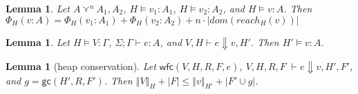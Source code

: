 \documentclass[11pt]{article}
\newcommand{\ssize}[2]{\left\Vert #2 \right\Vert_{#1}}
\newcommand{\gc}[3]{\mathsf{gc}(#1,#2,#3)}
\newcommand{\wfc}[5]{\mathsf{wfc}(#1,#2,#3,#4,#5)}
\newtheorem{lemma}[theorem]{Lemma}
\theoremstyle{definition}
\begin{document}
\begin{lemma}\label{itm:shareSize}
	Let $A \curlyvee^n A_1,A_2$, $H \vDash v_1 : A_1$, $H \vDash v_2 : A_2$, 
	and $H \vDash v : A$. Then $\Phi_{H}(v : A) = 
	\Phi_{H}(v_1 : A_1) + \Phi_{H}(v_2 : A_2) + n\cdot |dom(reach_H(v))|$
\end{lemma}

\begin{lemma}
	Let $H \vDash V : \Gamma$, $\Sigma;\Gamma \vdash e : A$, and $V,H \vdash e \Downarrow v,H'$. Then 
	$H' \vDash v : A$.
\end{lemma}

\iffalse
\begin{lemma}[heap conservation]
Let $\wfc{V}{H}{R}{F}{e}$, $V,H,R,F \; \vdash e \Downarrow v, H', F'$, and $g = \gc{H'}{R}{F'}$. 
Then $\ssize{H}{V} + |F| \le \ssize{H'}{v} + |F' \cup g|$.
\end{lemma}
\end{document}
